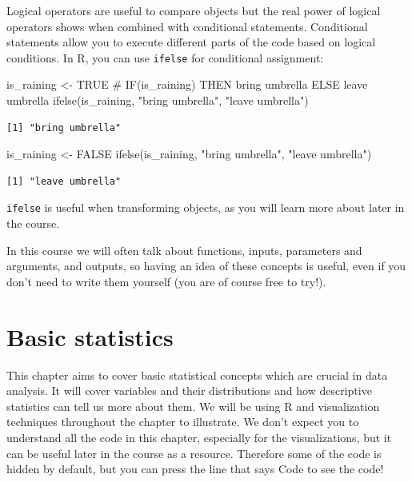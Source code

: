 \documentclass[
  letterpaper,
  DIV=11,
  numbers=noendperiod]{scrreprt}
\newenvironment{Shaded}{\begin{snugshade}}{\end{snugshade}}
\newcommand{\CommentTok}[1]{\textcolor[rgb]{0.37,0.37,0.37}{#1}}
\newcommand{\ConstantTok}[1]{\textcolor[rgb]{0.56,0.35,0.01}{#1}}
\newcommand{\FunctionTok}[1]{\textcolor[rgb]{0.28,0.35,0.67}{#1}}
\newcommand{\NormalTok}[1]{\textcolor[rgb]{0.00,0.23,0.31}{#1}}
\newcommand{\OtherTok}[1]{\textcolor[rgb]{0.00,0.23,0.31}{#1}}
\newcommand{\StringTok}[1]{\textcolor[rgb]{0.13,0.47,0.30}{#1}}
\begin{document}
Logical operators are useful to compare objects but the real power of
logical operators shows when combined with conditional statements.
Conditional statements allow you to execute different parts of the code
based on logical conditions. In R, you can use \texttt{ifelse} for
conditional assignment:

\begin{Shaded}
\begin{Highlighting}[]
\NormalTok{is\_raining }\OtherTok{\textless{}{-}} \ConstantTok{TRUE}
\CommentTok{\# IF(is\_raining) THEN bring umbrella ELSE leave umbrella}
\FunctionTok{ifelse}\NormalTok{(is\_raining, }\StringTok{"bring umbrella"}\NormalTok{, }\StringTok{"leave umbrella"}\NormalTok{)}
\end{Highlighting}
\end{Shaded}

\begin{verbatim}
[1] "bring umbrella"
\end{verbatim}

\begin{Shaded}
\begin{Highlighting}[]
\NormalTok{is\_raining }\OtherTok{\textless{}{-}} \ConstantTok{FALSE}
\FunctionTok{ifelse}\NormalTok{(is\_raining, }\StringTok{"bring umbrella"}\NormalTok{, }\StringTok{"leave umbrella"}\NormalTok{)}
\end{Highlighting}
\end{Shaded}

\begin{verbatim}
[1] "leave umbrella"
\end{verbatim}

\texttt{ifelse} is useful when transforming objects, as you will learn
more about later in the course.

In this course we will often talk about functions, inputs, parameters
and arguments, and outputs, so having an idea of these concepts is
useful, even if you don't need to write them yourself (you are of course
free to try!).

\chapter{Basic statistics}\label{sec-basicstat}

This chapter aims to cover basic statistical concepts which are crucial
in data analysis. It will cover variables and their distributions and
how descriptive statistics can tell us more about them. We will be using
R and visualization techniques throughout the chapter to illustrate. We
don't expect you to understand all the code in this chapter, especially
for the visualizations, but it can be useful later in the course as a
resource. Therefore some of the code is hidden by default, but you can
press the line that says {Code} to see the code!
\end{document}
